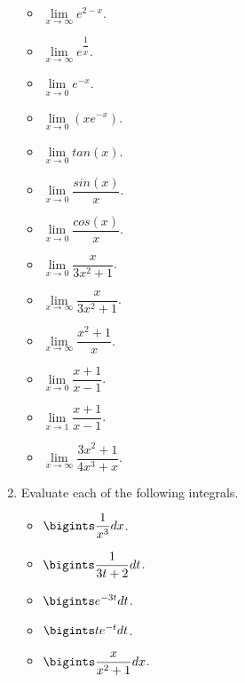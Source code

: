 \documentclass[fleqn]{article}
\begin{document}
\begin{enumerate}
\begin{itemize}
      \item $\lim\limits_{x \to \infty} e^{2-x}$. 

      \item $\lim\limits_{x \to \infty} e^{\dfrac{1}{x}}$. 

      \item $\lim\limits_{x \to 0} e^{-x}$. 

      \item $\lim\limits_{x \to 0} \left(x e^{-x}\right)$.
      
      \item $\lim\limits_{x \to 0} tan(x)$. 

      \item $\lim\limits_{x \to 0} \dfrac{sin(x)}{x}$. 

      \item $\lim\limits_{x \to 0} \dfrac{cos(x)}{x}$. 

      \item $\lim\limits_{x \to 0} \dfrac{x}{3x^2+1}$.
      
      \item $\lim\limits_{x \to \infty} \dfrac{x}{3x^2+1}$. 

      \item $\lim\limits_{x \to \infty} \dfrac{x^2+1}{x}$. 

      \item $\lim\limits_{x \to 0} \dfrac{x+1}{x-1}$. 

      \item $\lim\limits_{x \to 1} \dfrac{x+1}{x-1}$.
      
      \item $\lim\limits_{x \to \infty} \dfrac{3x^2+1}{4x^3+x}$. 
    \end{itemize}

    \item Evaluate each of the following integrals. 
    \begin{itemize}
      \item $\bigints \dfrac{1}{x^3} dx$.

      \item $\bigints \dfrac{1}{3t+2} dt$.

      \item $\bigints e^{-3t} dt$.

      \item $\bigints t e^{-t} dt$.

      \item $\bigints \dfrac{x}{x^2+1} dx$.


\end{itemize}
\end{enumerate}
\end{document}
